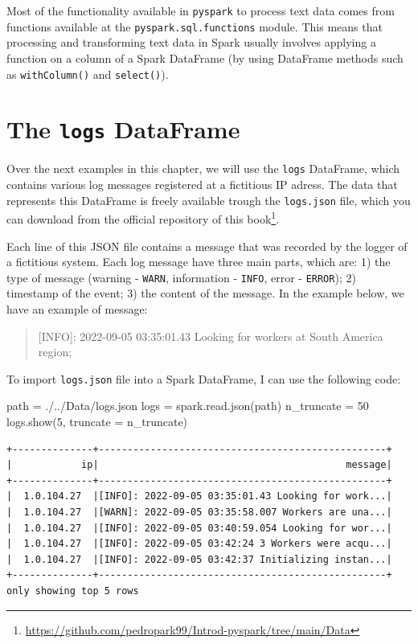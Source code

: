 \documentclass[
  11pt,
  letterpaper,
  DIV=11,
  numbers=noendperiod]{scrreprt}
\newenvironment{Shaded}{\begin{snugshade}}{\end{snugshade}}
\newcommand{\DecValTok}[1]{\textcolor[rgb]{0.68,0.00,0.00}{#1}}
\newcommand{\NormalTok}[1]{\textcolor[rgb]{0.00,0.23,0.31}{#1}}
\newcommand{\OperatorTok}[1]{\textcolor[rgb]{0.37,0.37,0.37}{#1}}
\newcommand{\StringTok}[1]{\textcolor[rgb]{0.13,0.47,0.30}{#1}}
\begin{document}
Most of the functionality available in \texttt{pyspark} to process text
data comes from functions available at the
\texttt{pyspark.sql.functions} module. This means that processing and
transforming text data in Spark usually involves applying a function on
a column of a Spark DataFrame (by using DataFrame methods such as
\texttt{withColumn()} and \texttt{select()}).

\hypertarget{the-logs-dataframe}{%
\section{\texorpdfstring{The \texttt{logs}
DataFrame}{The logs DataFrame}}\label{the-logs-dataframe}}

Over the next examples in this chapter, we will use the \texttt{logs}
DataFrame, which contains various log messages registered at a
fictitious IP adress. The data that represents this DataFrame is freely
available trough the \texttt{logs.json} file, which you can download
from the official repository of this book\footnote{\url{https://github.com/pedropark99/Introd-pyspark/tree/main/Data}}.

Each line of this JSON file contains a message that was recorded by the
logger of a fictitious system. Each log message have three main parts,
which are: 1) the type of message (warning - \texttt{WARN}, information
- \texttt{INFO}, error - \texttt{ERROR}); 2) timestamp of the event; 3)
the content of the message. In the example below, we have an example of
message:

\begin{quote}
{[}INFO{]}: 2022-09-05 03:35:01.43 Looking for workers at South America
region;
\end{quote}

To import \texttt{logs.json} file into a Spark DataFrame, I can use the
following code:

\begin{Shaded}
\begin{Highlighting}[]
\NormalTok{path }\OperatorTok{=} \StringTok{\textquotesingle{}./../Data/logs.json\textquotesingle{}}
\NormalTok{logs }\OperatorTok{=}\NormalTok{ spark.read.json(path)}
\NormalTok{n\_truncate }\OperatorTok{=} \DecValTok{50}
\NormalTok{logs.show(}\DecValTok{5}\NormalTok{, truncate }\OperatorTok{=}\NormalTok{ n\_truncate)}
\end{Highlighting}
\end{Shaded}

\begin{verbatim}
+--------------+--------------------------------------------------+
|            ip|                                           message|
+--------------+--------------------------------------------------+
|  1.0.104.27  |[INFO]: 2022-09-05 03:35:01.43 Looking for work...|
|  1.0.104.27  |[WARN]: 2022-09-05 03:35:58.007 Workers are una...|
|  1.0.104.27  |[INFO]: 2022-09-05 03:40:59.054 Looking for wor...|
|  1.0.104.27  |[INFO]: 2022-09-05 03:42:24 3 Workers were acqu...|
|  1.0.104.27  |[INFO]: 2022-09-05 03:42:37 Initializing instan...|
+--------------+--------------------------------------------------+
only showing top 5 rows
\end{verbatim}
\end{document}
